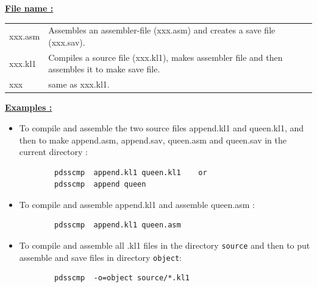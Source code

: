 \noindent\underline{\bf File name :}\vspace{2ex}\par
\begin{center}
\begin{tabular}{l@{ :: }p{120mm}}
xxx.asm &
Assembles an assembler-file (xxx.asm) and creates a save file (xxx.sav).\\
xxx.kl1 &
Compiles a source file (xxx.kl1), makes assembler file and then assembles it
to make save file.\\
xxx &
same as xxx.kl1.\\
\end{tabular}
\end{center}
\vspace{3ex}
\noindent\underline{\bf Examples :}\vspace{2ex}\par
\begin{itemize}
\item To compile and assemble the two source files append.kl1 and queen.kl1,
and then to make append.asm, append.sav, queen.asm and queen.sav
in the current directory :
\begin{verbatim}
        pdsscmp  append.kl1 queen.kl1    or
        pdsscmp  append queen
\end{verbatim}

\item To compile and assemble append.kl1 and assemble queen.asm :
\begin{verbatim}
        pdsscmp  append.kl1 queen.asm
\end{verbatim}

\item To compile and assemble all .kl1 files in the directory \verb|source|
 and then to put assemble and save files in directory \verb|object|:
\begin{verbatim}
        pdsscmp  -o=object source/*.kl1
\end{verbatim}
\end{itemize}

